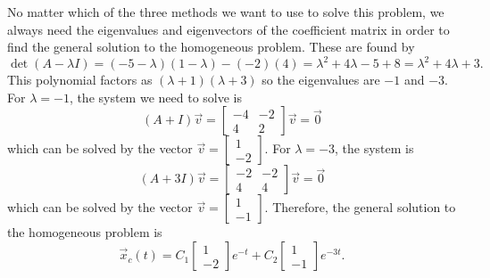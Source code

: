 \documentclass{ximera}
\begin{document}
\begin{exampleSol}
    No matter which of the three methods we want to use to solve this problem, we always need the eigenvalues and eigenvectors of the coefficient matrix in order to find the general solution to the homogeneous problem. These are found by
    \begin{equation*}
        \det(A - \lambda I) = (-5-\lambda)(1-\lambda) - (-2)(4) = \lambda^2 + 4\lambda -5+8 = \lambda^2 + 4\lambda + 3.
    \end{equation*}
    This polynomial factors as $(\lambda + 1)(\lambda+3)$ so the eigenvalues are $-1$ and $-3$. For $\lambda = -1$, the system we need to solve is
    \begin{equation*}
        (A + I)\vec{v} = \begin{bmatrix} -4 & -2 \\ 4 & 2 \end{bmatrix}\vec{v} = \vec{0}
    \end{equation*}
    which can be solved by the vector $\vec{v} = \left[ \begin{smallmatrix} 1 \\ -2 \end{smallmatrix} \right]$. For $\lambda = -3$, the system is
    \begin{equation*}
        (A + 3I)\vec{v} = \begin{bmatrix} -2 & -2 \\ 4 & 4 \end{bmatrix}\vec{v}  = \vec{0}
    \end{equation*}
    which can be solved by the vector $\vec{v} = \left[ \begin{smallmatrix} 1 \\ -1 \end{smallmatrix} \right]$. Therefore, the general solution to the homogeneous problem is
    \begin{equation} \label{eq:genSolAllEx}
        \vec{x}_c(t) = C_1\begin{bmatrix} 1 \\ -2 \end{bmatrix}e^{-t} + C_2\begin{bmatrix} 1 \\ -1 \end{bmatrix}e^{-3t}.
    \end{equation}
    

\end{exampleSol}
\end{document}
